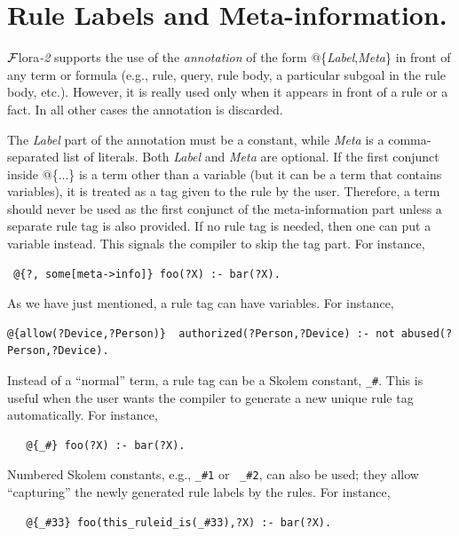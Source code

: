 \documentclass[11pt]{article}
\newcommand{\FLORA}{{\mbox{\sc ${\cal F}${lora}\rm\emph{-2}}}\xspace}
\begin{document}
  


\section{Rule Labels and Meta-information.}
\label{sec-rule-label}

\FLORA supports the use of the \emph{annotation} of the form
@\{\emph{Label},\emph{Meta}\} in front of any term or formula (e.g., rule,
query, rule body, a particular subgoal in the rule body, etc.). However,
it is really used only when it appears in front of a rule or a fact.
In all other cases the annotation is discarded.

The \emph{Label} part of the annotation
must be a constant, while \emph{Meta} is a comma-separated list of literals.
Both \emph{Label} and \emph{Meta} are optional. If the first conjunct
inside @\{...\} is a term other than a variable (but it can be a term that
contains variables), it is treated as a tag given
to the rule by the user. Therefore, a
term should never be used as the first conjunct of the
meta-information part unless a separate rule tag is also provided.
If no rule tag is needed, then one can put a variable instead. This
signals the compiler to skip the tag part. For instance,
\begin{verbatim}
 @{?, some[meta->info]} foo(?X) :- bar(?X).
\end{verbatim}
As we have just mentioned, a rule tag can have variables. For instance,
\begin{verbatim}
@{allow(?Device,?Person)}  authorized(?Person,?Device) :- not abused(?Person,?Device).
\end{verbatim}


Instead of a ``normal'' term, a rule tag can be a Skolem
constant, {\tt \_\#}.  This is useful when the user wants the compiler to
generate a new unique rule tag automatically. For instance,
\begin{verbatim}
   @{_#} foo(?X) :- bar(?X).
\end{verbatim}
Numbered Skolem constants, e.g., {\tt \_\#1} or {\tt
  \_\#2}, can also be used;
they allow ``capturing'' the newly generated
rule labels by the rules. For instance,
\begin{verbatim}
   @{_#33} foo(this_ruleid_is(_#33),?X) :- bar(?X).
\end{verbatim}
\end{document}
